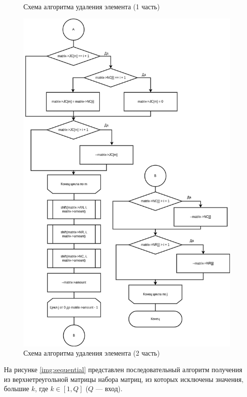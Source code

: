 \begin{figure}[H]
\begin{center}
	\end{center}
	\captionsetup{justification=centering}
	\caption{Схема алгоритма удаления элемента (1 часть)}
	\label{img:alg1}
\end{figure}

\begin{figure}[H]
	\begin{center}
		\includegraphics[scale=0.51]{img/alg2.png}
	\end{center}
	\captionsetup{justification=centering}
	\caption{Схема алгоритма удаления элемента (2 часть)}
	\label{img:alg2}
\end{figure}

На рисунке \ref{img:sequential} представлен последовательный алгоритм получения из верхнетреугольной матрицы набора матриц, из которых исключены значения, большие $k$, где $k\in [1,Q]$ ($Q$ --- вход).

